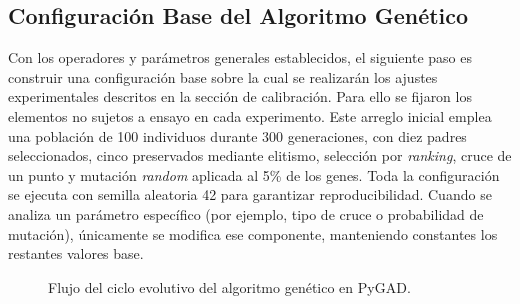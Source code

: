 \subsection{Configuración Base del Algoritmo Genético}
\label{subsec:configuracion-ag}

Con los operadores y parámetros generales establecidos, el siguiente paso es construir una configuración 
base sobre la cual se realizarán los ajustes experimentales descritos en la sección de calibración. Para 
ello se fijaron los elementos no sujetos a ensayo en cada experimento. Este arreglo inicial emplea una 
población de 100 individuos durante 300 
generaciones, con diez padres seleccionados, cinco preservados mediante elitismo, selección por 
\textit{ranking}, cruce de un punto y mutación \textit{random} aplicada al 5\% de los genes. Toda la 
configuración se ejecuta con semilla aleatoria 42 para garantizar reproducibilidad. Cuando se analiza 
un parámetro específico (por ejemplo, tipo de cruce o probabilidad de mutación), únicamente se modifica 
ese componente, manteniendo constantes los restantes valores base.

\begin{figure}[H]
\centering
\shorthandoff{>}%
%
\shorthandon{>}
\caption{Flujo del ciclo evolutivo del algoritmo genético en PyGAD.}
\end{figure}

